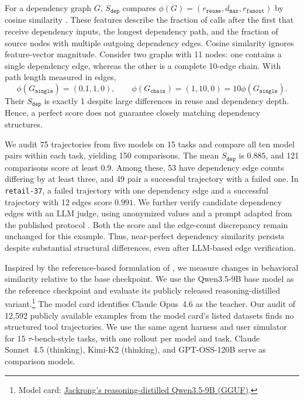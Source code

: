 For a dependency graph $G$, $S_{\mathtt{dep}}$ compares
$\phi(G)=(r_{\mathtt{reuse}},d_{\mathtt{max}},r_{\mathtt{fanout}})$ by cosine
similarity \citep[Appendix~B.4]{yang2026agents}. These features describe
the fraction of calls after the first that receive dependency inputs,
the longest dependency path, and the fraction of
source nodes with multiple outgoing dependency edges. Cosine similarity
ignores feature-vector magnitude. Consider two graphs with 11 nodes:
one contains a single dependency edge, whereas the other is a complete
10-edge chain. With path length measured in edges,
\begin{equation}
    \phi(G_{\mathtt{single}})=(0.1,1,0),\qquad
    \phi(G_{\mathtt{chain}})=(1,10,0)
    =10\phi(G_{\mathtt{single}}).
    \label{eq:dependency-counterexample}
\end{equation}
Their $S_{\mathtt{dep}}$ is exactly 1 despite large differences in reuse
and dependency depth. Hence, a perfect score does
not guarantee closely matching dependency structures.

We audit 75 trajectories from five models on 15 tasks and compare all
ten model pairs within each task, yielding 150 comparisons.
The mean $S_{\mathtt{dep}}$ is $0.885$,
and 121 comparisons score at least $0.9$. Among these, 53 have dependency
edge counts differing by at least three, and 49 pair a successful
trajectory with a failed one. In \texttt{retail-37}, a failed trajectory
with one dependency edge and a successful trajectory with 12 edges score
$0.991$. We further verify candidate dependency edges with an LLM judge,
using anonymized values and a prompt adapted from the published protocol
\citep[Appendix~B.1]{yang2026agents}.
Both the score and the edge-count discrepancy remain unchanged for this
example.
Thus, near-perfect dependency similarity persists despite substantial
structural differences, even after LLM-based edge verification.

\label{sec:reasoning-distillation-convergence}
Inspired by the reference-based formulation of \citet{rawat2026reference},
we measure changes in behavioral similarity relative to the base checkpoint.
We use the Qwen3.5-9B base model as the reference checkpoint and evaluate
its publicly released reasoning-distilled variant.\footnote{Model card:
\href{https://huggingface.co/Jackrong/Qwen3.5-9B-Claude-4.6-Opus-Reasoning-Distilled-v2-GGUF}{Jackrong's
reasoning-distilled Qwen3.5-9B (GGUF)}.}
The model card identifies Claude Opus~4.6 as the teacher.
Our audit of 12,592 publicly available examples from the model card's
listed datasets finds no structured tool trajectories.
We use the same agent harness
and user simulator for 15 $\tau$-bench-style tasks, with one rollout per
model and task. Claude Sonnet~4.5 (thinking), Kimi-K2 (thinking), and
GPT-OSS-120B serve as comparison models.

